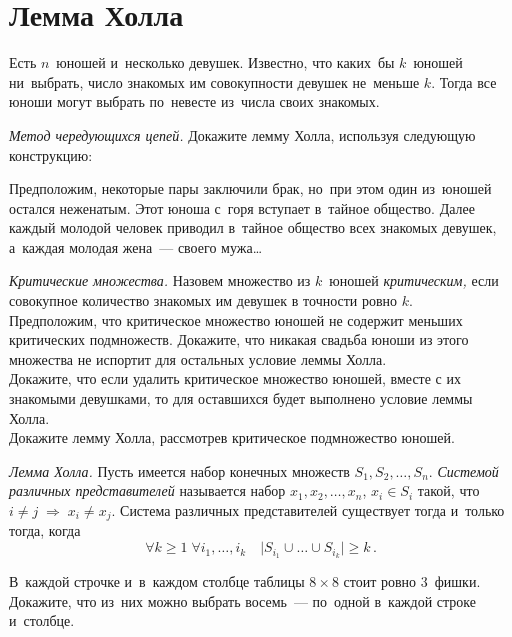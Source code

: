
\section*{Лемма Холла}


Есть $n$~юношей и~несколько девушек.
Известно, что каких~бы $k$~юношей ни~выбрать, число знакомых им совокупности
девушек не~меньше $k$.
Тогда все юноши могут выбрать по~невесте из~числа своих знакомых.

\begingroup
    \def\abs#1{\lvert #1 \rvert}

\begin{problems}

\item \emph{Метод чередующихся цепей.}
Докажите лемму Холла, используя следующую конструкцию:
\begin{list}{}{}\item
    Предположим, некоторые пары заключили брак, но~при этом один из~юношей
    остался неженатым.
    Этот юноша с~горя вступает в~тайное общество.
    Далее каждый молодой человек приводил в~тайное общество всех знакомых
    девушек, а~каждая молодая жена~--- своего мужа\ldots
\end{list}

\item \emph{Критические множества.}
Назовем множество из $k$~юношей \emph{критическим,} если совокупное количество
знакомых им девушек в точности ровно $k$.
\\
\subproblem
Предположим, что критическое множество юношей не содержит меньших критических
подмножеств.
Докажите, что никакая свадьба юноши из этого множества не испортит для
остальных условие леммы Холла.
\\
\subproblem
Докажите, что если удалить критическое множество юношей, вместе с их знакомыми
девушками, то для оставшихся будет выполнено условие леммы Холла.
\\
\subproblem
Докажите лемму Холла, рассмотрев критическое подмножество юношей.

\item \emph{Лемма Холла.}
Пусть имеется набор конечных множеств $S_1, S_2, \ldots, S_n$.
\emph{Системой различных представителей} называется набор
$x_1, x_2, \ldots, x_n$, $x_i \in S_i$ такой, что
\(
    i \neq j
\;\Rightarrow\;
    x_i \neq x_j
\).
Система различных представителей существует тогда и~только тогда, когда
\[
    \forall k \geq 1
\;
    \forall i_1, \ldots, i_k
\quad
    \abs{S_{i_1} \cup \ldots \cup S_{i_k}} \geq k
\, . \]

\item
В~каждой строчке и~в~каждом столбце таблицы $8 \times 8$ стоит ровно $3$~фишки.
Докажите, что из~них можно выбрать восемь~--- по~одной в~каждой строке
и~столбце.

\end{problems}

